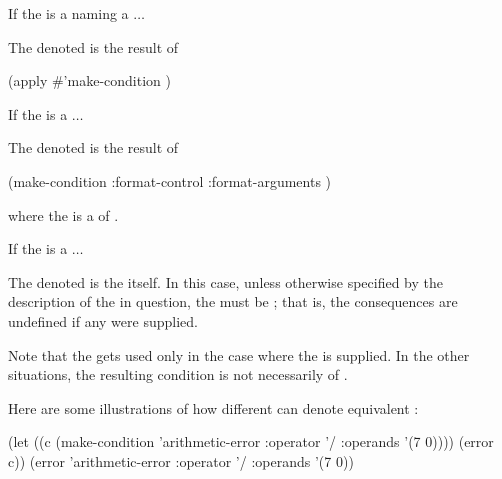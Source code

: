 \beginlist

\item{{\bull} If the  is a  
              naming a   $\ldots$}

The denoted  is the result of

\code
 (apply #'make-condition  )
\endcode

\item{{\bull} If the  is a  $\ldots$}

The denoted  is the result of 

\code
 (make-condition  
                 :format-control 
                 :format-arguments )
\endcode
{}

where the  is a  of .

\item{{\bull} If the  is a  $\ldots$}

The denoted  is the  itself.
In this case, unless otherwise specified by the description of the
 in question, the  must be ;
that is, the consequences are undefined if any  were supplied. 

\endlist

Note that the  gets used only in the case where
the   is supplied.  In the other situations,
the resulting condition is not necessarily of  .

Here are some illustrations of how different 
can denote equivalent  :

\code
(let ((c (make-condition 'arithmetic-error :operator '/ :operands '(7 0))))
  (error c))
\EQ (error 'arithmetic-error :operator '/ :operands '(7 0))

